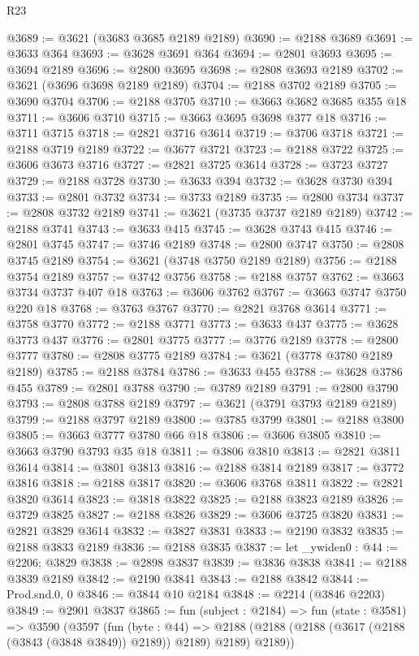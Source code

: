 \begin{lexlean}{R23}
\begin{coremodule}
@3689 := @3621 (@3683 @3685 @2189 @2189)
@3690 := @2188 @3689
@3691 := @3633 @364
@3693 := @3628 @3691 @364
@3694 := @2801 @3693
@3695 := @3694 @2189
@3696 := @2800 @3695
@3698 := @2808 @3693 @2189
@3702 := @3621 (@3696 @3698 @2189 @2189)
@3704 := @2188 @3702 @2189
@3705 := @3690 @3704
@3706 := @2188 @3705
@3710 := @3663 @3682 @3685 @355 @18
@3711 := @3606 @3710
@3715 := @3663 @3695 @3698 @377 @18
@3716 := @3711 @3715
@3718 := @2821 @3716 @3614
@3719 := @3706 @3718
@3721 := @2188 @3719 @2189
@3722 := @3677 @3721
@3723 := @2188 @3722
@3725 := @3606 @3673 @3716
@3727 := @2821 @3725 @3614
@3728 := @3723 @3727
@3729 := @2188 @3728
@3730 := @3633 @394
@3732 := @3628 @3730 @394
@3733 := @2801 @3732
@3734 := @3733 @2189
@3735 := @2800 @3734
@3737 := @2808 @3732 @2189
@3741 := @3621 (@3735 @3737 @2189 @2189)
@3742 := @2188 @3741
@3743 := @3633 @415
@3745 := @3628 @3743 @415
@3746 := @2801 @3745
@3747 := @3746 @2189
@3748 := @2800 @3747
@3750 := @2808 @3745 @2189
@3754 := @3621 (@3748 @3750 @2189 @2189)
@3756 := @2188 @3754 @2189
@3757 := @3742 @3756
@3758 := @2188 @3757
@3762 := @3663 @3734 @3737 @407 @18
@3763 := @3606 @3762
@3767 := @3663 @3747 @3750 @220 @18
@3768 := @3763 @3767
@3770 := @2821 @3768 @3614
@3771 := @3758 @3770
@3772 := @2188 @3771
@3773 := @3633 @437
@3775 := @3628 @3773 @437
@3776 := @2801 @3775
@3777 := @3776 @2189
@3778 := @2800 @3777
@3780 := @2808 @3775 @2189
@3784 := @3621 (@3778 @3780 @2189 @2189)
@3785 := @2188 @3784
@3786 := @3633 @455
@3788 := @3628 @3786 @455
@3789 := @2801 @3788
@3790 := @3789 @2189
@3791 := @2800 @3790
@3793 := @2808 @3788 @2189
@3797 := @3621 (@3791 @3793 @2189 @2189)
@3799 := @2188 @3797 @2189
@3800 := @3785 @3799
@3801 := @2188 @3800
@3805 := @3663 @3777 @3780 @66 @18
@3806 := @3606 @3805
@3810 := @3663 @3790 @3793 @35 @18
@3811 := @3806 @3810
@3813 := @2821 @3811 @3614
@3814 := @3801 @3813
@3816 := @2188 @3814 @2189
@3817 := @3772 @3816
@3818 := @2188 @3817
@3820 := @3606 @3768 @3811
@3822 := @2821 @3820 @3614
@3823 := @3818 @3822
@3825 := @2188 @3823 @2189
@3826 := @3729 @3825
@3827 := @2188 @3826
@3829 := @3606 @3725 @3820
@3831 := @2821 @3829 @3614
@3832 := @3827 @3831
@3833 := @2190 @3832
@3835 := @2188 @3833 @2189
@3836 := @2188 @3835
@3837 := let _ywiden0 : @44 := @2206; @3829
@3838 := @2898 @3837
@3839 := @3836 @3838
@3841 := @2188 @3839 @2189
@3842 := @2190 @3841
@3843 := @2188 @3842
@3844 := Prod.snd.{0, 0}
@3846 := @3844 @10 @2184
@3848 := @2214 (@3846 @2203)
@3849 := @2901 @3837
@3865 := fun (subject : @2184) =>
  fun (state : @3581) =>
  @3590
    (@3597
      (fun (byte : @44) =>
      @2188 (@2188 (@2188 (@3617 (@2188 (@3843 (@3848 @3849)) @2189)) @2189) @2189) @2189))

\end{coremodule}
\end{lexlean}
